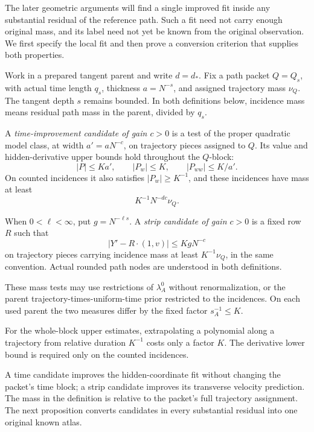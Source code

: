 The later geometric arguments will find a single improved fit inside
any substantial residual of the reference path.  Such a fit need not
carry enough original mass, and its label need not yet be known from the
original observation.  We first specify the local fit and then prove a
conversion criterion that supplies both properties.
\begin{definition}\label{a03:candidates}
Work in a prepared tangent parent and write \(d=d_*\).  Fix a path
packet \(Q=Q_s\), with actual time length \(q_s\), thickness
\(a=N^{-s}\), and assigned trajectory mass \(\nu_Q\).  The tangent
depth \(s\) remains bounded.  In both definitions below, incidence
mass means residual path mass in the parent, divided by \(q_s\).

A \emph{time-improvement candidate of gain \(c>0\)} is a test of the
proper quadratic model class, at width \(a'=aN^{-c}\), on trajectory
pieces assigned to \(Q\).  Its value and hidden-derivative upper
bounds hold throughout the \(Q\)-block:
\[
 |P|\le Ka',\qquad |P_w|\le K,\qquad |P_{ww}|\le K/a'.
\]
On counted incidences it also satisfies \(|P_w|\ge K^{-1}\), and
these incidences have mass at least
\[
 K^{-1}N^{-dc}\nu_Q.
\]

When \(0<\ell<\infty\), put \(g=N^{-\ell s}\).  A
\emph{strip candidate of gain \(c>0\)} is a fixed row \(R\) such that
\[
 |Y'-R\cdot(1,v)|\le KgN^{-c}
\]
on trajectory pieces carrying incidence mass at least
\(K^{-1}\nu_Q\), in the same convention.  Actual rounded path nodes are
understood in both definitions.

These mass tests may use restrictions of \(\lambda_A^0\) without
renormalization, or the parent trajectory-times-uniform-time prior
restricted to the incidences.  On each used parent the two measures
differ by the fixed factor \(s_A^{-1}\le K\).
\end{definition}

For the whole-block upper estimates, extrapolating a polynomial along
a trajectory from relative duration \(K^{-1}\) costs only a factor
\(K\).  The derivative lower bound is required only on the counted
incidences.

A time candidate improves the hidden-coordinate fit without changing the
packet's time block; a strip candidate improves its transverse velocity
prediction.  The mass in the definition is relative to the packet's full
trajectory assignment.  The next proposition converts candidates in every
substantial residual into one original known atlas.

